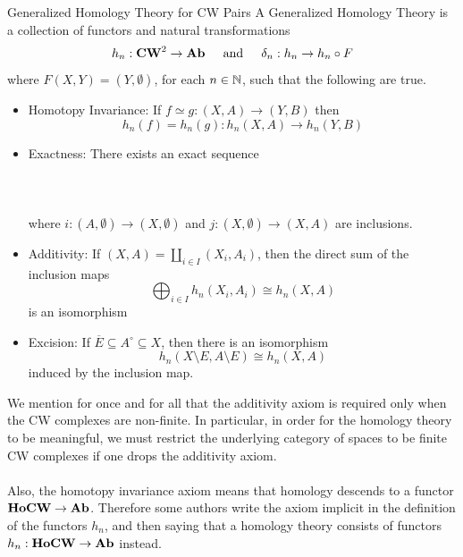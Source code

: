 \documentclass[a4paper]{article}
\begin{document}
\begin{defn}{Generalized Homology Theory for CW Pairs}{} A Generalized Homology Theory is a collection of functors and natural transformations $$h_n:\bold{CW}^2\to\bold{Ab}\;\;\;\;\text{ and }\;\;\;\;\delta_n:h_n\to h_n\circ F$$ where $F(X,Y)=(Y,\emptyset)$, for each $n\in\mathbb{N}$, such that the following are true. 
\begin{itemize}
\item Homotopy Invariance: If $f\simeq g:(X,A)\to(Y,B)$ then $$h_n(f)=h_n(g):h_n(X,A)\to h_n(Y,B)$$
\item Exactness: There exists an exact sequence \\~\\
\\~\\
where $i:(A,\emptyset)\to(X,\emptyset)$ and $j:(X,\emptyset)\to(X,A)$ are inclusions. 
\item Additivity: If $(X,A)=\coprod_{i\in I}(X_i,A_i)$, then the direct sum of the inclusion maps $$\bigoplus_{i\in I}h_n(X_i,A_i)\cong h_n(X,A)$$ is an isomorphism
\item Excision: If $\overline{E}\subseteq A^\circ\subseteq X$, then there is an isomorphism $$h_n(X\setminus E,A\setminus E)\cong h_n(X,A)$$ induced by the inclusion map. 
\end{itemize}
\end{defn}

We mention for once and for all that the additivity axiom is required only when the CW complexes are non-finite. In particular, in order for the homology theory to be meaningful, we must restrict the underlying category of spaces to be finite CW complexes if one drops the additivity axiom. \\~\\

Also, the homotopy invariance axiom means that homology descends to a functor $\bold{HoCW}\to\bold{Ab}$. Therefore some authors write the axiom implicit in the definition of the functors $h_n$, and then saying that a homology theory consists of functors $h_n:\bold{HoCW}\to\bold{Ab}$ instead. 
\end{document}
